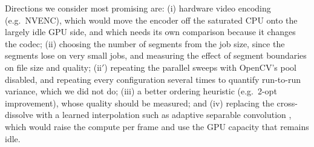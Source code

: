 \documentclass[conference]{IEEEtran}
\begin{document}
Directions we consider most promising are: (i) hardware video encoding (e.g.\ NVENC), which would move the encoder off the saturated CPU onto the largely idle GPU side, and which needs its own comparison because it changes the codec; (ii) choosing the number of segments from the job size, since the segments lose on very small jobs, and measuring the effect of segment boundaries on file size and quality; (ii$'$) repeating the parallel sweeps with OpenCV's pool disabled, and repeating every configuration several times to quantify run-to-run variance, which we did not do; (iii) a better ordering heuristic (e.g.\ 2-opt improvement), whose quality should be measured; and (iv) replacing the cross-dissolve with a learned interpolation such as adaptive separable convolution \cite{niklaus2017}, which would raise the compute per frame and use the GPU capacity that remains idle.
\end{document}
